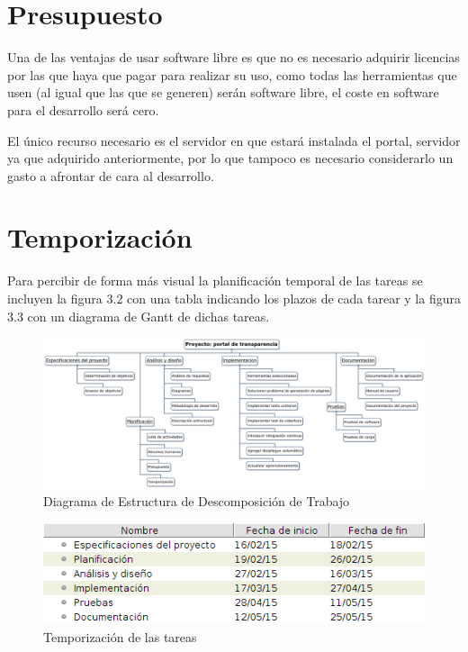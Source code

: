 \section{Presupuesto}

Una de las ventajas de usar software libre es que no es necesario adquirir licencias por las que haya que pagar para realizar 
su uso, como todas las herramientas que usen (al igual que las que se generen) serán software libre, el coste en software para 
el desarrollo será cero.

\bigskip

El único recurso necesario es el servidor en que estará instalada el portal, servidor ya que adquirido anteriormente, por
lo que tampoco es necesario considerarlo un gasto a afrontar de cara al desarrollo.

\section{Temporización}

Para percibir de forma más visual la planificación temporal de las tareas se incluyen la figura 3.2 con una tabla indicando los
plazos de cada tarear y la figura 3.3 con un diagrama de Gantt de dichas tareas.
\newpage

\begin{figure}[!ht]
  \begin{center}
    \includegraphics[scale=0.25,angle=90]{imagenes/diagrama_edt.png}
    \caption{Diagrama de Estructura de Descomposición de Trabajo}
    \label{fig:diag_edt}
  \end{center}
\end{figure}

\newpage
\begin{figure}[!ht]
  \begin{center}
    \includegraphics[width=1\textwidth]{imagenes/tempo_tareas.png}
    \caption{Temporización de las tareas}
    \label{fig:tempo_tareas}
  \end{center}
\end{figure}


